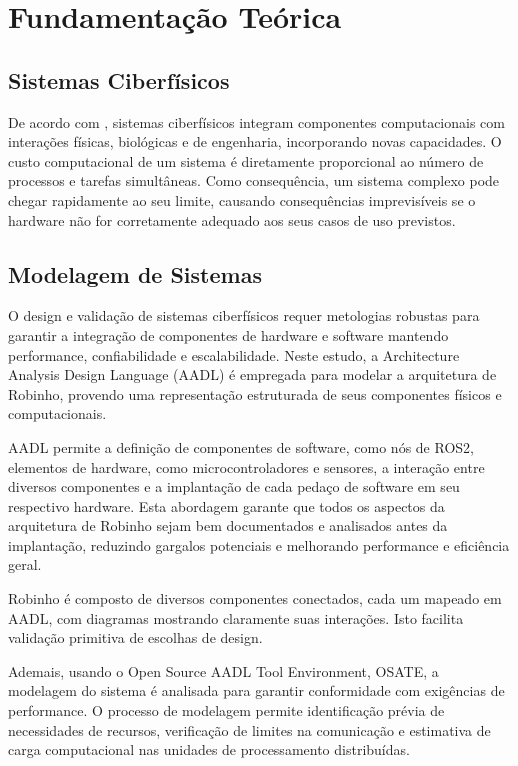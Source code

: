 \chapter{Fundamentação Teórica}

\section{Sistemas Ciberfísicos}

De acordo com \cite{Moraes2013}, sistemas ciberfísicos integram componentes computacionais com interações físicas, biológicas e de engenharia, incorporando novas capacidades. O custo computacional de um sistema é diretamente proporcional ao número de processos e tarefas simultâneas. Como consequência, um sistema complexo pode chegar rapidamente ao seu limite, causando consequências imprevisíveis se o hardware não for corretamente adequado aos seus casos de uso previstos. \cite{SennBourdon2022}


\section{Modelagem de Sistemas}

O design e validação de sistemas ciberfísicos requer metologias robustas para garantir a integração de componentes de hardware e software mantendo performance, confiabilidade e escalabilidade. Neste estudo, a Architecture Analysis Design Language (AADL) é empregada para modelar a arquitetura de Robinho, provendo uma representação estruturada de seus componentes físicos e computacionais.

AADL permite a definição de componentes de software, como nós de ROS2, elementos de hardware, como microcontroladores e sensores, a interação entre diversos componentes e a implantação de cada pedaço de software em seu respectivo hardware. Esta abordagem garante que todos os aspectos da arquitetura de Robinho sejam bem documentados e analisados antes da implantação, reduzindo gargalos potenciais e melhorando performance e eficiência geral.

Robinho é composto de diversos componentes conectados, cada um mapeado em AADL, com diagramas mostrando claramente suas interações. Isto facilita validação primitiva de escolhas de design. 

Ademais, usando o Open Source AADL Tool Environment, OSATE, a modelagem do sistema é analisada para garantir conformidade com exigências de performance. O processo de modelagem permite identificação prévia de necessidades de recursos, verificação de limites na comunicação e estimativa de carga computacional nas unidades de processamento distribuídas.

